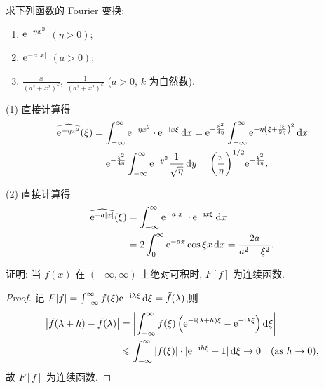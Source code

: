 \begin{exercise}
  求下列函数的 Fourier 变换:
  \begin{enumerate}[(1),left=\parindent]
    \item $\mathrm{e}^{-\eta x^2}$ $(\eta>0)$;
    \item $\mathrm{e}^{-a|x|}$ $(a>0)$;
    \item $\frac{x}{(a^2+x^2)^k}$, $\frac{1}{(a^2+x^2)^k}$ ($a>0$, $k$ 为自然数).
  \end{enumerate}
\end{exercise}

\begin{solution}
  (1) 直接计算得
  \begin{align*}
    \widehat{\mathrm{e}^{-\eta x^2}}(\xi)
    & = \int_{-\infty}^{\infty} \mathrm{e}^{-\eta x^2}\cdot \mathrm{e}^{-\mathrm{i} x\xi}\mathop{}\!\mathrm{d} x
      = \mathrm{e}^{-\frac{\xi^2}{4\eta}} \int_{-\infty}^{\infty}
      \mathrm{e}^{-\eta\left(\xi+\frac{\mathrm{i}\xi}{2\eta}\right)^2} \mathop{}\!\mathrm{d} x \\
    & = \mathrm{e}^{-\frac{\xi^2}{4\eta}} \int_{-\infty}^{\infty}
      \mathrm{e}^{-y^2} \frac{1}{\sqrt{\eta}} \mathop{}\!\mathrm{d} y
      = \biggl(\frac{\pi}{\eta}\biggr)^{1/2} \mathrm{e}^{-\frac{\xi^2}{4\eta}}.
    \end{align*}

  (2) 直接计算得
  \begin{align*}
    \widehat{\mathrm{e}^{-a|x|}} (\xi)
    & = \int_{-\infty}^{\infty} \mathrm{e}^{-a|x|}\cdot\mathrm{e}^{-\mathrm{i} x\xi} \mathop{}\!\mathrm{d} x \\
    & = 2\int_0^{\infty} \mathrm{e}^{-ax} \cos\xi x \mathop{}\!\mathrm{d} x = \frac{2a}{a^2+\xi^2}.
  \end{align*}
\end{solution}


\begin{exercise}
  证明: 当 $f(x)$ 在 $(-\infty,\infty)$ 上绝对可积时, $F[f]$ 为连续函数.
\end{exercise}

\begin{proof}
  记 $F[f]=\int_{-\infty}^{\infty} f(\xi)\mathrm{e}^{-\mathrm{i}\lambda\xi}\mathop{}\!\mathrm{d}\xi = \tilde{f}(\lambda)$,则
  \[\begin{split}
    \bigl|\tilde{f}(\lambda+h)-\tilde{f}(\lambda)\bigr|
    & = \left|\int_{-\infty}^{\infty}f(\xi)
        \left(\mathrm{e}^{-\mathrm{i}(\lambda+h)\xi} - \mathrm{e}^{-\mathrm{i}\lambda\xi}\right)\mathop{}\!\mathrm{d}\xi\right| \\
    & \leqslant \int_{-\infty}^{\infty}|f(\xi)|\cdot|\mathrm{e}^{-\mathrm{i} h\xi}-1|\mathop{}\!\mathrm{d}\xi\to 0
      \quad(\text{as } h\to 0),
  \end{split}\]
  故 $F[f]$ 为连续函数.
\end{proof}


